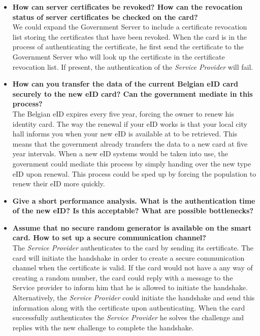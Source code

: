 \documentclass[12pt]{report}
\begin{document}
\begin{itemize}
\item \textbf{How can server certificates be revoked? How can the revocation status of server certificates be checked on the card?}\\
We could expand the Government Server to include a certificate revocation list storing the certificates that have been revoked. When the card is in the process of authenticating the certificate, he first send the certificate to the Government Server who will look up the certificate in the certificate revocation list. If present, the authentication of the \textit{Service Provider} will fail.

\item \textbf{How can you transfer the data of the current Belgian eID card securely to the new eID card? Can the government mediate in this process?}\\
The Belgian eID expires every five year, forcing the owner to renew his identity card. The way the renewal if your eID works is that your local city hall informs you when your new eID is available at to be retrieved. This means that the government already transfers the data to a new card at five year intervals. When a new eID systems would be taken into use, the government could mediate this process by simply handing over the new type eID upon renewal. This process could be sped up by forcing the population to renew their eID more quickly.

\item \textbf{Give a short performance analysis. What is the authentication time of the new eID? Is this acceptable? What are possible bottlenecks?}\\

\item \textbf{Assume that no secure random generator is available on the smart card. How to set up a secure communication channel?}\\
The \textit{Service Provider} authenticates to the card by sending its certificate. The card will initiate the handshake in order to create a secure communication channel when the certificate is valid. If the card would not have a any way of creating a random number, the card could reply with a message to the Service provider to inform him that he is allowed to initiate the handshake. Alternatively, the \textit{Service Provider} could initiate the handshake and send this information along with the certificate upon authenticating. When the card successfully authenticates the \textit{Service Provider} he solves the challenge and replies with the new challenge to complete the handshake.


\end{itemize}
\end{document}
